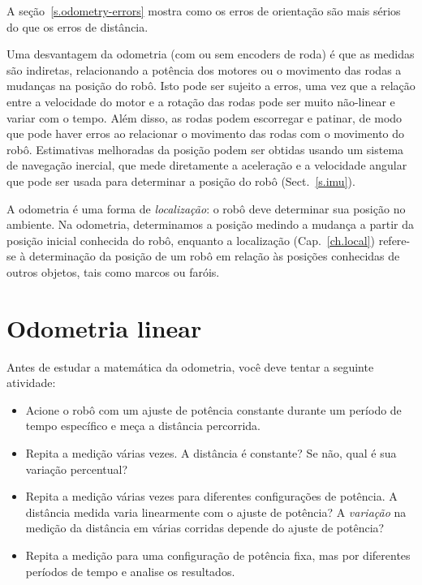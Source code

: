 A seção~\ref{s.odometry-errors} mostra como os erros de orientação são mais sérios do que os erros de distância.

Uma desvantagem da odometria (com ou sem encoders de roda) é que as medidas são indiretas, relacionando a potência dos motores ou o movimento das rodas a mudanças na posição do robô. Isto pode ser sujeito a erros, uma vez que a relação entre a velocidade do motor e a rotação das rodas pode ser muito não-linear e variar com o tempo. Além disso, as rodas podem escorregar e patinar, de modo que pode haver erros ao relacionar o movimento das rodas com o movimento do robô. Estimativas melhoradas da posição podem ser obtidas usando um sistema de navegação inercial, que mede diretamente a aceleração e a velocidade angular que pode ser usada para determinar a posição do robô (Sect.~\ref{s.imu}).

A odometria é uma forma de \emph{localização}: o robô deve determinar sua posição no ambiente. Na odometria, determinamos a posição medindo a mudança a partir da posição inicial conhecida do robô, enquanto a localização (Cap.~\ref{ch.local}) refere-se à determinação da posição de um robô em relação às posições conhecidas de outros objetos, tais como marcos ou faróis.

\section{Odometria linear}

Antes de estudar a matemática da odometria, você deve tentar a seguinte atividade:

\begin{framed}
\begin{itemize}
\item Acione o robô com um ajuste de potência constante durante um período de tempo específico e meça a distância percorrida.
\item Repita a medição várias vezes. A distância é constante? Se não, qual é sua variação percentual?
\item Repita a medição várias vezes para diferentes configurações de potência. A distância medida varia linearmente com o ajuste de potência? A \emph{variação} na medição da distância em várias corridas depende do ajuste de potência?
\item Repita a medição para uma configuração de potência fixa, mas por diferentes períodos de tempo e analise os resultados.
\end{itemize}
\end{framed}

